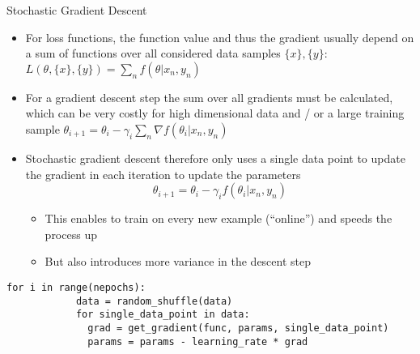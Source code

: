   \begin{frame}[fragile]{Stochastic Gradient Descent}
    \begin{itemize}
      \item For loss functions, the function value and thus the gradient usually depend on a sum of functions over all considered data samples $\{x\}, \{y\}$: $L(\theta, \{x\}, \{y\}) = \sum_n f(\theta | x_n, y_n)$
      \item For a gradient descent step the sum over all gradients must be calculated, which can be very costly for high dimensional data and / or a large training sample $\theta_{i+1} = \theta_i - \gamma_i \sum_n \nabla f(\theta_i | x_n, y_n)$
      \item Stochastic gradient descent therefore only uses a single data point to update the gradient in each iteration to update the parameters
      \begin{equation*}
        \theta_{i+1} = \theta_i - \gamma_i f(\theta_i | x_n, y_n)
      \end{equation*}
      \begin{itemize}
        \item This enables to train on every new example (\enquote{online}) and speeds the process up
        \item But also introduces more variance in the descent step
      \end{itemize}
    \end{itemize}
    \begin{mdframed}
      \begin{lstlisting}[style=dark, gobble=6, title=\lsttitlelight{Example Implementation}]
        for i in range(nepochs):
            data = random_shuffle(data)
            for single_data_point in data:
              grad = get_gradient(func, params, single_data_point)
              params = params - learning_rate * grad
      \end{lstlisting}
    \end{mdframed}
  \end{frame}

